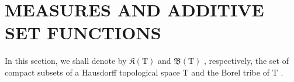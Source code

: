 \section{MEASURES AND ADDITIVE SET FUNCTIONS}

In this section, we shall denote by \(\mathfrak{K}(\mathrm{T})\) and \(\mathfrak{B}(\mathrm{T})\) , respectively, the set of compact subsets of a Hausdorff topological space \(\mathrm{T}\) and the Borel tribe of \(\mathrm{T}\) .

